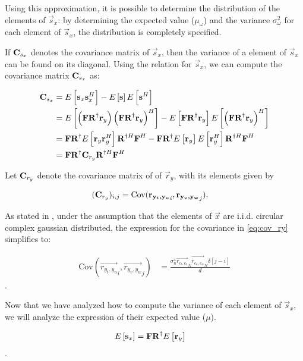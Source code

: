 \documentclass[a4paper, openany, oneside]{memoir}
\begin{document}
Using this approximation, it is possible to determine the distribution of the elements  of $\vec{s}_x$: by determining the expected value ($\mu_{\omega}$) and the variance $\sigma_{\omega}^2$ for each element of $\vec{s}_x$, the distribution is completely specified.

If $\boldsymbol{\mathbf{C}}_{s_x}$ denotes the covariance matrix of $\vec{s}_x$, then the variance of a element of $\vec{s}_x$ can be found on its diagonal.
Using the relation for $\vec{s}_x$, we can compute the covariance matrix $\boldsymbol{\mathbf{C}}_{s_x}$ as:

\begin{align*}
\boldsymbol{\mathbf{C}}_{s_x} &= E\left[\boldsymbol{\mathbf{s}}_x\boldsymbol{\mathbf{s}}_x^H\right] - E\left[\boldsymbol{\mathbf{s}}\right]E\left[\boldsymbol{\mathbf{s}}^H\right] \\
&= E\left[\left(\boldsymbol{\mathbf{F}} \boldsymbol{\mathbf{R}}^{\dagger}\boldsymbol{\mathbf{r}}_y\right) \left( \boldsymbol{\mathbf{F}}\boldsymbol{\mathbf{R}}^{\dagger}\boldsymbol{\mathbf{r}}_y\right)^H\right] - E\left[\boldsymbol{\mathbf{F}}\boldsymbol{\mathbf{R}}^{\dagger}\boldsymbol{\mathbf{r}}_y\right]E\left[\left(\boldsymbol{\mathbf{F}}\boldsymbol{\mathbf{R}}^{\dagger}\boldsymbol{\mathbf{r}}_y\right)^H\right] \\
&= \boldsymbol{\mathbf{F}}\boldsymbol{\mathbf{R}}^{\dagger} E\left[ \boldsymbol{\mathbf{r}}_y\boldsymbol{\mathbf{r}}_y^H\right]  \boldsymbol{\mathbf{R}}^{\dagger H}\boldsymbol{\mathbf{F}}^H -  \boldsymbol{\mathbf{F}}\boldsymbol{\mathbf{R}}^{\dagger} E\left[ \boldsymbol{\mathbf{r}}_y\right] E\left[\boldsymbol{\mathbf{r}}_y^H\right]   \boldsymbol{\mathbf{R}}^{\dagger H}\boldsymbol{\mathbf{F}}^H \\
&= \boldsymbol{\mathbf{F}}\boldsymbol{\mathbf{R}}^{\dagger} \boldsymbol{\mathbf{C}}_{r_y} \boldsymbol{\mathbf{R}}^{\dagger H}\boldsymbol{\mathbf{F}}^H
\end{align*}

Let $\boldsymbol{\mathbf{C}}_{r_y}$ denote the covariance matrix of of $\vec{r}_y$, with its elements given by

\begin{align}\label{eq:cov_ry}
(\boldsymbol{\mathbf{C}}_{r_y})_{i,j} &= \text{Cov}(\boldsymbol{\mathbf{r_{y_t,y_u}}}_i,\boldsymbol{\mathbf{r_{y_v, y_w}}}_j).
\end{align}

As stated in \cite{ariananda2012compressive}, under the assumption that the elements of $\vec{x}$ are i.i.d. circular complex gaussian distributed, the expression for the covariance in \cref{eq:cov_ry} simplifies to:

\begin{align*}
\text{Cov}(\vec{r_{y_t,y_u}}_i,\vec{r_{y_v, y_w}}_j) &= \frac{\sigma_n^4 \vec{r_{c_t,c_v}}_N \vec{\overline{r}_{c_u,c_w}}_N \delta \left[ j-i\right]}{d}
\end{align*}.

Now that we have analyzed how to compute the variance of each element of $\vec{s}_x$, we will analyze the expression of their expected value ($\mu$).

\begin{align*}
E\left[\boldsymbol{\mathbf{s}}_x\right] &= \boldsymbol{\mathbf{F}}\boldsymbol{\mathbf{R}}^{\dagger}E\left[\boldsymbol{\mathbf{r}}_y\right] 
\end{align*}.
\end{document}
